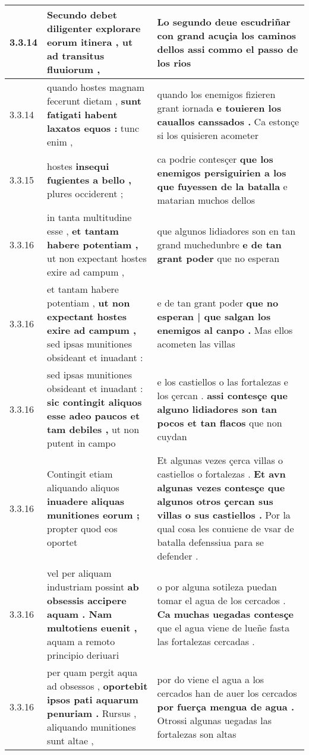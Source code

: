 \begin{tabular}{|p{1cm}|p{6.5cm}|p{6.5cm}|}
3.3.14 & Secundo debet diligenter \textbf{ explorare eorum itinera , } ut ad transitus fluuiorum , & Lo segundo deue escudriñar \textbf{ con grand acuçia los caminos dellos } assi commo el passo de los rios \\\hline
3.3.14 & quando hostes magnam fecerunt dietam , \textbf{ sunt fatigati habent laxatos equos : } tunc enim , & quando los enemigos fizieren grant iornada \textbf{ e touieren los cauallos canssados . } Ca estonçe si los quisieren acometer \\\hline
3.3.15 & hostes \textbf{ insequi fugientes a bello , } plures occiderent ; & ca podrie contesçer \textbf{ que los enemigos persiguirien a los que fuyessen de la batalla } e matarian muchos dellos \\\hline
3.3.16 & in tanta multitudine esse , \textbf{ et tantam habere potentiam , } ut non expectant hostes exire ad campum , & que algunos lidiadores son en tan grand muchedunbre \textbf{ e de tan grant poder } que no esperan \\\hline
3.3.16 & et tantam habere potentiam , \textbf{ ut non expectant hostes exire ad campum , } sed ipsas munitiones obsideant et inuadant : & e de tan grant poder \textbf{ que no esperan | que salgan los enemigos al canpo . } Mas ellos acometen las villas \\\hline
3.3.16 & sed ipsas munitiones obsideant et inuadant : \textbf{ sic contingit aliquos esse adeo paucos et tam debiles , } ut non putent in campo & e los castiellos o las fortalezas e los çercan . \textbf{ assi contesçe que alguno lidiadores son tan pocos et tan flacos } que non cuydan \\\hline
3.3.16 & Contingit etiam aliquando aliquos \textbf{ inuadere aliquas munitiones eorum ; } propter quod eos oportet & Et algunas vezes çerca villas o castiellos o fortalezas . \textbf{ Et avn algunas vezes contesçe que algunos otros çercan sus villas o sus castiellos . } Por la qual cosa les conuiene de vsar de batalla defenssiua para se defender . \\\hline
3.3.16 & vel per aliquam industriam possint \textbf{ ab obsessis accipere aquam . Nam multotiens euenit , } aquam a remoto principio deriuari & o por alguna sotileza puedan tomar el agua de los cercados . \textbf{ Ca muchas uegadas contesçe } que el agua viene de lueñe fasta las fortalezas cercadas . \\\hline
3.3.16 & per quam pergit aqua ad obsessos , \textbf{ oportebit ipsos pati aquarum penuriam . } Rursus , aliquando munitiones sunt altae , & por do viene el agua a los cercados han de auer los cercados \textbf{ por fuerça mengua de agua . } Otrossi algunas uegadas las fortalezas son altas \\\hline

\end{tabular}

